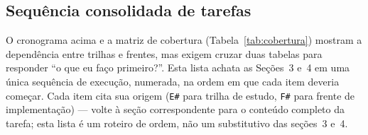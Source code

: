 \documentclass[11pt,a4paper]{article}
\begin{document}
\subsection{Sequência consolidada de tarefas}
\label{sec:sequencia}

O cronograma acima e a matriz de cobertura (Tabela~\ref{tab:cobertura}) mostram a
dependência entre trilhas e frentes, mas exigem cruzar duas tabelas para responder
``o que eu faço primeiro?''. Esta lista achata as Seções~3 e~4 em uma única sequência
de execução, numerada, na ordem em que cada item deveria começar. Cada item cita sua
origem (\texttt{E\#} para trilha de estudo, \texttt{F\#} para frente de
implementação) --- volte à seção correspondente para o conteúdo completo da tarefa;
esta lista é um roteiro de ordem, não um substitutivo das seções~3 e~4.
\end{document}
